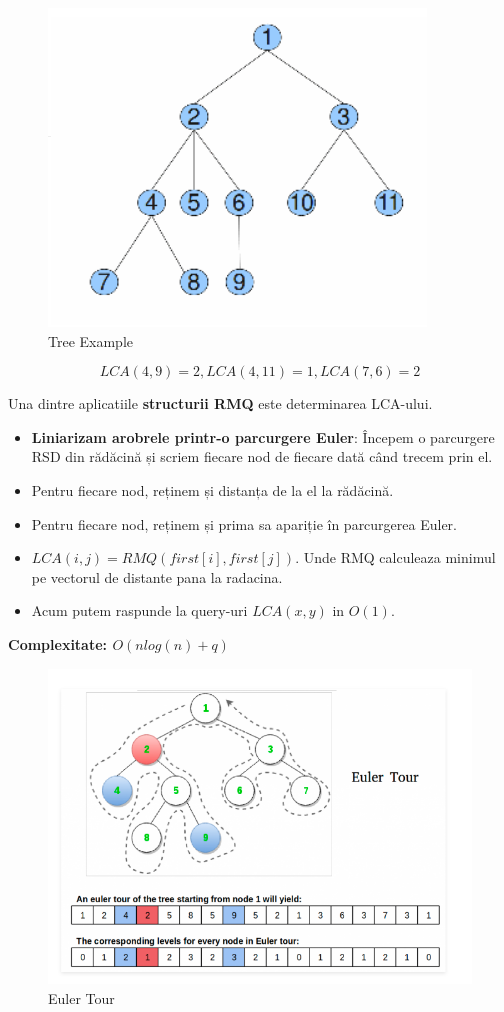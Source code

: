 \documentclass[11pt,a4paper]{article}
\theoremstyle{definition}
\theoremstyle{plain}
\theoremstyle{remark}
\begin{document}
\begin{figure}[H]
    \centering
    \includegraphics[width=0.45\linewidth]{lca-tree.png}
    \caption{Tree Example}
    \label{fig:enter-label}
\end{figure}

$$LCA(4,9) = 2, LCA(4,11) = 1, LCA(7,6) = 2$$

Una dintre aplicatiile \textbf{structurii RMQ} este determinarea LCA-ului.


\begin{itemize}
    \item \textbf{Liniarizam arobrele printr-o parcurgere Euler}: Începem o parcurgere RSD din rădăcină și scriem fiecare nod de fiecare dată când trecem prin el.
    \item Pentru fiecare nod, reținem și distanța de la el la rădăcină.
    \item Pentru fiecare nod, reținem și prima sa apariție în parcurgerea Euler.
    \item $LCA(i,j) = RMQ(first[i], first[j])$. Unde RMQ calculeaza minimul pe vectorul de distante pana la radacina.
    \item Acum putem raspunde la query-uri $LCA(x,y)$ in $O(1)$.
\end{itemize}

\textbf{Complexitate:  $O(nlog(n) + q)$}

\begin{figure}[H]
    \centering
    \includegraphics[width=0.75\linewidth]{lca-euler-tour.png}
    \caption{Euler Tour}
    \label{fig:enter-label}
\end{figure}
\end{document}
